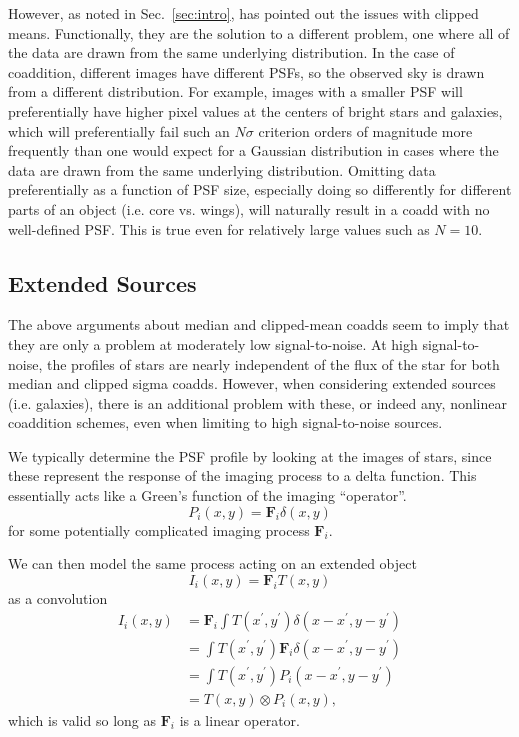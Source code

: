 \documentclass[modern]{style_and_logos/lsstdescnote}
\begin{document}
However, as noted in Sec.~\ref{sec:intro}, \citet{2018PASJ...70S...5B} has pointed out the issues with clipped means.  Functionally, they are the solution to a different problem, one where all of the data are drawn from the same underlying distribution.  In the case of coaddition, different images have different PSFs, so the observed sky is drawn from a different distribution.  For example, images with a smaller PSF will preferentially have higher pixel values at the centers of bright stars and galaxies, which will preferentially fail such an $N\sigma$ criterion orders of magnitude more frequently than one would expect for a Gaussian distribution in cases where the data are drawn from the same underlying distribution.  Omitting data preferentially as a function of PSF size, especially doing so differently for different parts of an object (i.e. core vs. wings), will naturally result in a coadd with no well-defined PSF. This is true even for relatively large values such as $N=10$.  

\subsection{Extended Sources}

The above arguments about median and clipped-mean coadds seem to imply that they are only a
problem at moderately low signal-to-noise.  At high signal-to-noise, the profiles of stars are nearly
independent of the flux of the star for both median and clipped sigma coadds.  
However, when considering extended sources (i.e. galaxies),
there is an additional problem with these, or indeed any, nonlinear coaddition schemes,
even when limiting to high signal-to-noise sources.

We typically determine the PSF profile by looking at the images of stars, since these represent
the response of the imaging process to a delta function.  This essentially acts like a
Green's function of the imaging ``operator''.
\begin{equation}
    P_i(x,y) = \mathbf{F}_i \delta(x,y)
\end{equation}
for some potentially complicated imaging process $\mathbf{F}_i$.

We can then model the same process acting on an extended object
\begin{equation}
    I_i(x,y) = \mathbf{F}_i T(x,y)
\end{equation}
as a convolution
\begin{align}
    I_i(x,y) &= \mathbf{F}_i \int T(x^\prime,y^\prime) \delta(x-x^\prime,y-y^\prime) \nonumber\\
    &= \int T(x^\prime,y^\prime) \mathbf{F}_i \delta(x-x^\prime,y-y^\prime) \nonumber\\
    &= \int T(x^\prime,y^\prime) P_i(x-x^\prime,y-y^\prime) \nonumber\\
    &= T(x,y) \otimes P_i(x,y),
\end{align}
which is valid so long as $\mathbf{F}_i$ is a linear operator.
\end{document}
